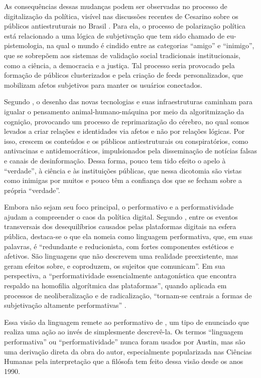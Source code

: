 \documentclass[portuguese]{textolivre}
\begin{document}
As consequências dessas mudanças podem ser observadas no processo de digitalização da política, visível nas discussões recentes de Cesarino sobre os públicos antiestruturais no Brasil \cite{cesarino2007reencontro,cesarino2019identidade,cesarino2020populismo,cesarino2021a,cesarino2021b,cesarino2022a,cesarino2022b}. Para ela, o processo de polarização política está relacionado a uma lógica de subjetivação que tem sido chamado de eu-pistemologia, na qual o mundo é cindido entre as categorias “amigo” e “inimigo”, que se sobrepõem aos sistemas de validação social tradicionais institucionais, como a ciência, a democracia e a justiça. Tal processo seria provocado pela formação de públicos clusterizados e pela criação de feeds personalizados, que mobilizam afetos subjetivos para manter os usuários conectados.

Segundo \textcite{cesarino2022b}, o desenho das novas tecnologias e suas infraestruturas caminham para igualar o pensamento animal-humano-máquina por meio da algoritmização da cognição, provocando um processo de reprimarização do cérebro, no qual somos levados a criar relações e identidades via afetos e não por relações lógicas. Por isso, crescem os conteúdos e os públicos antiestruturais ou conspiratórios, como antivacinas e antidemocráticos, impulsionados pela disseminação de notícias falsas e canais de desinformação. Dessa forma, pouco tem tido efeito o apelo à “verdade”, à ciência e às instituições públicas, que nessa dicotomia são vistas como inimigas por muitos e pouco têm a confiança dos que se fecham sobre a própria “verdade”.

Embora não sejam seu foco principal, o performativo e a performatividade ajudam a compreender o caos da política digital. Segundo \textcite[p. 86]{cesarino2021b}, entre os eventos transversais dos desequilíbrios causados pelas plataformas digitais na esfera pública, destaca-se o que ela nomeia como linguagem performativa, que, em suas palavras, é “redundante e reducionista, com fortes componentes estéticos e afetivos. São linguagens que não descrevem uma realidade preexistente, mas geram efeitos sobre, e coproduzem, os sujeitos que comunicam”. Em sua perspectiva, a “performatividade essencialmente antagonística que encontra respaldo na homofilia algorítmica das plataformas”, quando aplicada em processos de neoliberalização e de radicalização, “tornam-se centrais a formas de subjetivação altamente performativas” \cite[p. 86]{cesarino2021b}.

Essa visão da linguagem remete ao performativo de \textcite{austin1962how}, um tipo de enunciado que realiza uma ação ao invés de simplesmente descrevê-la. Os termos “linguagem performativa” ou “performatividade” nunca foram usados por Austin, mas são uma derivação direta da obra do autor, especialmente popularizada nas Ciências Humanas pela interpretação que a filósofa \textcite{butler1997excitable,butler1998fundamentos,butler1999gender,butler2015quadros,butler2017vida} tem feito dessa visão desde os anos 1990.
\end{document}

